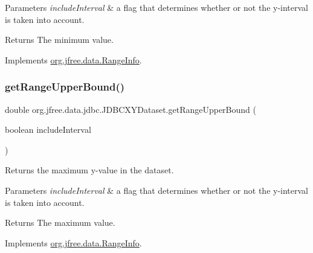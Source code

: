 \begin{DoxyParams}{Parameters}
{\em include\+Interval} & a flag that determines whether or not the y-\/interval is taken into account.\\
\hline
\end{DoxyParams}
\begin{DoxyReturn}{Returns}
The minimum value. 
\end{DoxyReturn}


Implements \mbox{\hyperlink{interfaceorg_1_1jfree_1_1data_1_1_range_info_ab0187015bbe75ca00a62a71de72c1a1d}{org.\+jfree.\+data.\+Range\+Info}}.

\mbox{\label{classorg_1_1jfree_1_1data_1_1jdbc_1_1_j_d_b_c_x_y_dataset_a65026164f00394b483b43d73c8313ade}} 
\subsubsection{\texorpdfstring{get\+Range\+Upper\+Bound()}{getRangeUpperBound()}}
{\footnotesize\ttfamily double org.\+jfree.\+data.\+jdbc.\+J\+D\+B\+C\+X\+Y\+Dataset.\+get\+Range\+Upper\+Bound (\begin{DoxyParamCaption}\item[{boolean}]{include\+Interval }\end{DoxyParamCaption})}

Returns the maximum y-\/value in the dataset.


\begin{DoxyParams}{Parameters}
{\em include\+Interval} & a flag that determines whether or not the y-\/interval is taken into account.\\
\hline
\end{DoxyParams}
\begin{DoxyReturn}{Returns}
The maximum value. 
\end{DoxyReturn}


Implements \mbox{\hyperlink{interfaceorg_1_1jfree_1_1data_1_1_range_info_a85987bb398c50351d190b2b888ff3348}{org.\+jfree.\+data.\+Range\+Info}}.

\mbox{\label{classorg_1_1jfree_1_1data_1_1jdbc_1_1_j_d_b_c_x_y_dataset_a4950f410e03cd36228f997986cc90423}} 
